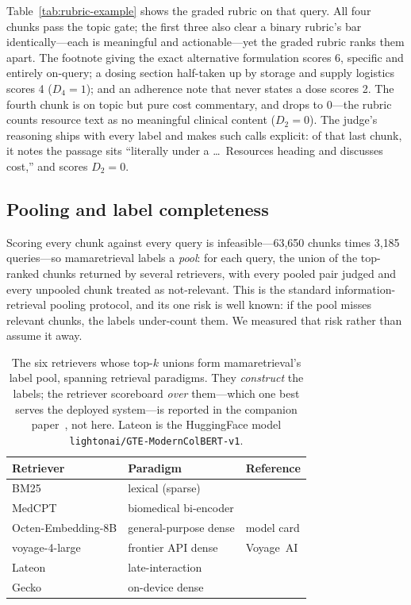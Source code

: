 Table~\ref{tab:rubric-example} shows the graded rubric on that query. All four
chunks pass the topic gate; the first three also clear a binary rubric's bar
identically---each is meaningful and actionable---yet the graded rubric ranks
them apart. The footnote giving the exact alternative formulation scores 6,
specific and entirely on-query; a dosing section half-taken up by storage and
supply logistics scores 4 ($D_4=1$); and an adherence note that never states a
dose scores 2. The fourth chunk is on topic but pure cost commentary, and drops
to 0---the rubric counts resource text as no meaningful clinical content
($D_2=0$). The judge's reasoning ships with every label and makes such calls
explicit: of that last chunk, it notes the passage sits ``literally under a
\dots\ Resources heading and discusses cost,'' and scores $D_2=0$.

\subsection{Pooling and label completeness}
\label{sec:mr-pooling}

Scoring every chunk against every query is infeasible---63{,}650 chunks times
3{,}185 queries---so mamaretrieval labels a \emph{pool}: for each query, the
union of the top-ranked chunks returned by several retrievers, with every pooled
pair judged and every unpooled chunk treated as not-relevant. This is the
standard information-retrieval pooling protocol, and its one risk is well known:
if the pool misses relevant chunks, the labels under-count them. We measured that
risk rather than assume it away.

\begin{table}[t]
\centering
\small
\setlength{\tabcolsep}{6pt}
\renewcommand{\arraystretch}{1.15}
\caption{The six retrievers whose top-$k$ unions form mamaretrieval's label pool,
spanning retrieval paradigms. They \emph{construct} the labels; the
retriever scoreboard \emph{over} them---which one best serves the deployed
system---is reported in the companion paper~\cite{ren2026mamai}, not here. Lateon is the HuggingFace model
\texttt{lightonai/GTE-ModernColBERT-v1}.}
\label{tab:retrievers}
\begin{tabular}{@{}lll@{}}
\toprule
Retriever & Paradigm & Reference \\
\midrule
BM25               & lexical (sparse)      & \cite{robertson2009bm25} \\
MedCPT             & biomedical bi-encoder & \cite{jin2023medcpt} \\
Octen-Embedding-8B & general-purpose dense & model card\tablefootnote{\url{https://huggingface.co/Octen/Octen-Embedding-8B}} \\
voyage-4-large     & frontier API dense    & Voyage~AI\tablefootnote{\url{https://www.voyageai.com}} \\
Lateon             & late-interaction      & \cite{khattab2020colbert} \\
Gecko              & on-device dense       & \cite{lee2024gecko} \\
\bottomrule
\end{tabular}
\end{table}

